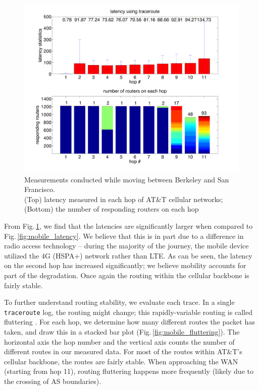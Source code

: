\begin{figure}[!tbh]
  \centering
  \includegraphics[width=\linewidth]{../figs/mobile_sfo.pdf}
  \vspace{-1em}
  \caption{Measurements conducted while moving between Berkeley and San Francisco.\\ (Top) latency measured in each hop of AT\&T cellular networks; (Bottom) the number of responding routers on each hop}
  \label{fig:mobile_mobile}
\end{figure}

From Fig.\,\ref{fig:mobile_mobile}, we find that the latencies are significantly larger when compared to Fig.\,\ref{fig:mobile_latency}. We believe that this is in part due to a difference in radio access technology -- during the majority of the journey, the mobile device utilized the 4G (HSPA+) network rather than LTE. As can be seen, the latency on the second hop has increased significantly; we believe mobility accounts for part of the degradation. Once again the routing within the cellular backbone is fairly stable.

To further understand routing stability, we evaluate each trace. In a single \texttt{traceroute} log, the routing might change; this rapidly-variable routing is called fluttering \cite{paxson1997measurements}. For each hop, we determine how many different routes the packet has taken, and draw this in a stacked bar plot (Fig.\,\ref{fig:mobile_fluttering}). The horizontal axis the hop number and the vertical axis counts the number of different routes in our measured data. For most of the routes within AT\&T's cellular backbone, the routes are fairly stable. When approaching the WAN (starting from hop 11), routing fluttering happens more frequently (likely due to the crossing of AS boundaries).

